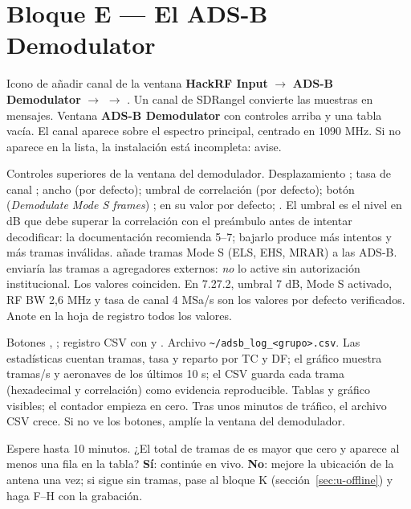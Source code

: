 \section{Bloque E --- El ADS-B Demodulator}
\label{sec:u-demod}

{Icono de añadir canal de la ventana \textbf{HackRF Input} $\rightarrow$ \textbf{ADS-B Demodulator} $\rightarrow$  $\rightarrow$ .}
{}
{Un canal de SDRangel convierte las muestras en mensajes.}
{Ventana \textbf{ADS-B Demodulator} con controles arriba y una tabla vacía.}
{El canal aparece sobre el espectro principal, centrado en 1090 MHz.}
{Si no aparece en la lista, la instalación está incompleta: avise.}

{Controles superiores de la ventana del demodulador.}
{Desplazamiento ; tasa de canal  ; ancho   (por defecto); umbral de correlación  (por defecto); botón  (\emph{Demodulate Mode S frames}) ;  en su valor por defecto;  .}
{El umbral es el nivel en dB que debe superar la correlación con el preámbulo antes de intentar decodificar: la documentación recomienda 5--7; bajarlo produce más intentos y más tramas inválidas.  añade tramas Mode S (ELS, EHS, MRAR) a las ADS-B.  enviaría las tramas a agregadores externos: \emph{no} lo active sin autorización institucional.}
{Los valores coinciden. En 7.27.2, umbral 7 dB, Mode S activado, RF BW 2,6 MHz y tasa de canal 4 MSa/s son los valores por defecto verificados.}
{Anote en la hoja de registro todos los valores.}
{}

{Botones , ; registro CSV con  y .}
{Archivo \texttt{\textasciitilde/adsb\_log\_<grupo>.csv}.}
{Las estadísticas cuentan tramas, tasa y reparto por TC y DF; el gráfico muestra tramas/s y aeronaves de los últimos 10 s; el CSV guarda cada trama (hexadecimal y correlación) como evidencia reproducible.}
{Tablas y gráfico visibles; el contador empieza en cero.}
{Tras unos minutos de tráfico, el archivo CSV crece.}
{Si no ve los botones, amplíe la ventana del demodulador.}

\begin{checkpoint}
Espere hasta 10 minutos. ¿El total de tramas de  es mayor que cero y aparece al menos una fila en la tabla? \textbf{Sí}: continúe en vivo. \textbf{No}: mejore la ubicación de la antena una vez; si sigue sin tramas, pase al bloque K (sección~\ref{sec:u-offline}) y haga F--H con la grabación.
\end{checkpoint}

